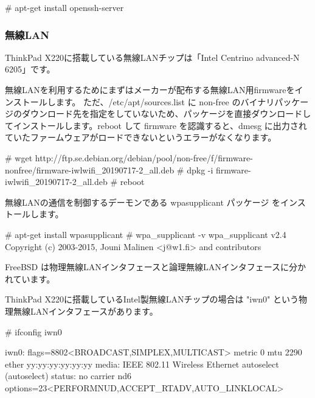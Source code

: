 \documentclass[mingoth,a4paper]{jsarticle}
\begin{document}
\begin{commandline}
# apt-get install openssh-server
\end{commandline}


\subsubsection{無線LAN}


ThinkPad X220に搭載している無線LANチップは「Intel Centrino advanced-N 6205」です。

無線LANを利用するためにまずはメーカーが配布する無線LAN用firmwareをインストールします。
ただ、/etc/apt/sources.list に non-free のバイナリパッケージのダウンロード先を指定をしていないため、パッケージを直接ダウンロードしてインストールします。reboot して firmware を認識すると、dmesg に出力されていたファームウェアがロードできないというエラーがなくなります。

\begin{commandline}
# wget http://ftp.se.debian.org/debian/pool/non-free/f/firmware-nonfree/firmware-iwlwifi_20190717-2_all.deb
# dpkg -i firmware-iwlwifi_20190717-2_all.deb
# reboot
\end{commandline}

無線LANの通信を制御するデーモンである wpasupplicant パッケージ をインストールします。

\begin{commandline}
# apt-get install wpasupplicant
# wpa_supplicant -v
wpa_supplicant v2.4
Copyright (c) 2003-2015, Jouni Malinen <j@w1.fi> and contributors
\end{commandline}



FreeBSD は物理無線LANインタフェースと論理無線LANインタフェースに分かれています。

ThinkPad X220に搭載しているIntel製無線LANチップの場合は "iwn0" という物理無線LANインタフェースがあります。

\begin{commandline}
# ifconfig iwn0

iwn0: flags=8802<BROADCAST,SIMPLEX,MULTICAST> metric 0 mtu 2290
        ether yy:yy:yy:yy:yy:yy
        media: IEEE 802.11 Wireless Ethernet autoselect (autoselect)
        status: no carrier
        nd6 options=23<PERFORMNUD,ACCEPT_RTADV,AUTO_LINKLOCAL>
\end{commandline}
\end{document}
